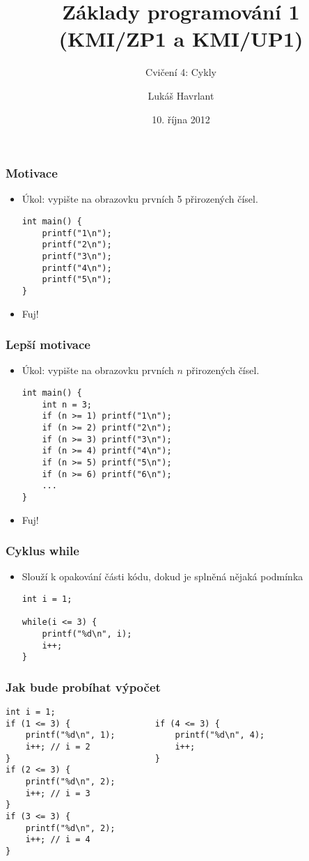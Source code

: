 \documentclass{beamer}
\title{Základy programování 1 (KMI/ZP1 a KMI/UP1)}
\subtitle{Cvičení 4: Cykly}
\author{Lukáš Havrlant}
\date{10. října 2012}
\institute{Univerzita Palackého}
\newenvironment{itemizex}%
  {\large \begin{itemize}%
    \setlength{\itemsep}{8pt}%
    \setlength{\parskip}{8pt}}%
  {\end{itemize}}
\begin{document}
\begin{frame}[t,plain]
\titlepage
\end{frame}


\begin{frame}[t,fragile]\frametitle{Motivace} 
  \begin{itemizex}
    \item Úkol: vypište na obrazovku prvních 5 přirozených čísel. 
    \begin{verbatim} 
int main() {
    printf("1\n");
    printf("2\n");
    printf("3\n");
    printf("4\n");
    printf("5\n");
}
    \end{verbatim}
    \item Fuj!
  \end{itemizex}
\end{frame}


\begin{frame}[t,fragile]\frametitle{Lepší motivace} 
  \begin{itemizex}
    \item Úkol: vypište na obrazovku prvních $n$ přirozených čísel.
    \begin{verbatim} 
int main() {
    int n = 3;
    if (n >= 1) printf("1\n");
    if (n >= 2) printf("2\n");
    if (n >= 3) printf("3\n");
    if (n >= 4) printf("4\n");
    if (n >= 5) printf("5\n");
    if (n >= 6) printf("6\n");
    ...
}
    \end{verbatim}
    \item Fuj!
  \end{itemizex}
\end{frame}


\begin{frame}[t,fragile]\frametitle{Cyklus while} 
  \begin{itemizex}
    \item Slouží k opakování části kódu, dokud je splněná nějaká podmínka
    \begin{verbatim} 
int i = 1;

while(i <= 3) {
    printf("%d\n", i);
    i++;
}
    \end{verbatim}
  \end{itemizex}
\end{frame}

\begin{frame}[t,fragile]\frametitle{Jak bude probíhat výpočet} 
  \begin{verbatim} 
int i = 1;             
if (1 <= 3) {                 if (4 <= 3) {
    printf("%d\n", 1);            printf("%d\n", 4);
    i++; // i = 2                 i++;
}                             }
if (2 <= 3) {
    printf("%d\n", 2);
    i++; // i = 3
}
if (3 <= 3) {
    printf("%d\n", 2);
    i++; // i = 4
}
  \end{verbatim}
\end{frame}
\end{document}
